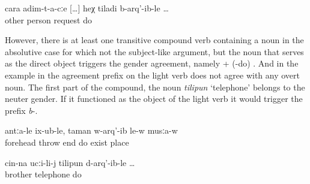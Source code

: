 %
\begin{exe}
	\ex	\label{ex:when we asked other people}
	\gll	cara	adim-t-a-cːe	[\ldots]	heχ	tiladi	b-arq'-ib-le	\ldots\\
		other	person	{} 		request	do\\
	\glt	{}
\end{exe}

However, there is at least one transitive compound verb containing a noun in the absolutive case for which not the subject-like argument, but the noun that serves as the direct object triggers the gender agreement, namely   +  (-do)  . And in the example in  the agreement prefix on the light verb does not agree with any overt noun. The first part of the compound, the noun \textit{tilipun} `telephone' belongs to the neuter gender. If it functioned as the object of the light verb it would trigger the prefix \textit{b}-.
%
\begin{exe}
	\ex	\label{ex:(They) shot him into the forehead}
	\gll	antːa-le	ix-ub-le,	taman	w-arq'-ib	le-w	musːa-w\\
		forehead	throw	end	do	exist	place\\
	\glt	{}

	\ex	\label{ex:when (they) called the brother on the phone}
	\gll	cin-na	ucːi-li-j	tilipun	d-arq'-ib-le	\ldots\\
			brother	telephone	do\\
	\glt	{}
\end{exe}

